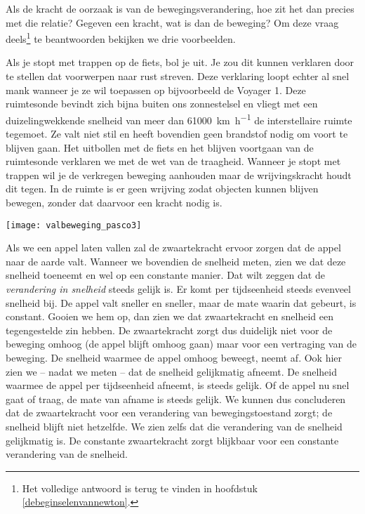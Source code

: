 \documentclass{ximera}
\begin{document}
Als de kracht de oorzaak is van de bewegingsverandering, hoe zit het dan precies met die relatie? 
Gegeven een kracht, wat is dan de beweging? 
Om deze vraag deels\footnote{Het volledige antwoord is terug te vinden in hoofdstuk \ref{debeginselenvannewton}.} te beantwoorden bekijken we drie voorbeelden.

Als je stopt met trappen op de fiets, bol je uit. 
Je zou dit kunnen verklaren door te stellen dat voorwerpen naar rust streven. 
Deze verklaring loopt echter al snel mank wanneer je ze wil toepassen op bijvoorbeeld de Voyager 1. Deze ruimtesonde bevindt zich bijna buiten ons zonnestelsel en vliegt met een duizelingwekkende snelheid van meer dan \SI{61000}{\kilo\meter\per\hour} de interstellaire ruimte tegemoet. 
Ze valt niet stil en heeft bovendien geen brandstof nodig om voort te blijven gaan. 
Het uitbollen met de fiets en het blijven voortgaan van de ruimtesonde verklaren we met de wet van de traagheid. 
Wanneer je stopt met trappen wil je de verkregen beweging aanhouden maar de wrijvingskracht houdt dit tegen. 
In de ruimte is er geen wrijving zodat objecten kunnen blijven bewegen, zonder dat daarvoor een kracht nodig is.

\begin{image}[0.6\textwidth]
\texttt{[image: valbeweging\_pasco3]}
\end{image}

Als we een appel laten vallen zal de zwaartekracht ervoor zorgen dat de appel naar de aarde valt. 
Wanneer we bovendien de snelheid meten, zien we dat deze snelheid toeneemt en wel op een constante manier. 
Dat wilt zeggen dat de \textit{verandering in snelheid} steeds gelijk is. 
Er komt per tijdseenheid steeds evenveel snelheid bij.  
De appel valt sneller en sneller, maar de mate waarin dat gebeurt, is constant. 
Gooien we hem op, dan zien we dat zwaartekracht en snelheid een tegengestelde zin hebben. 
De zwaartekracht zorgt dus duidelijk niet voor de beweging omhoog (de appel blijft omhoog gaan) maar voor een vertraging van de beweging. 
De snelheid waarmee de appel omhoog beweegt, neemt af. 
Ook hier zien we -- nadat we meten -- dat de snelheid gelijkmatig afneemt. 
De snelheid waarmee de appel per tijdseenheid afneemt, is steeds gelijk. 
Of de appel nu snel gaat of traag, de mate van afname is steeds gelijk. 
We kunnen dus concluderen dat de zwaartekracht voor een verandering van bewegingstoestand zorgt; de snelheid blijft niet hetzelfde. 
We zien zelfs dat die verandering van de snelheid gelijkmatig is. 
De constante zwaartekracht zorgt blijkbaar voor een constante verandering van de snelheid. 
\end{document}
